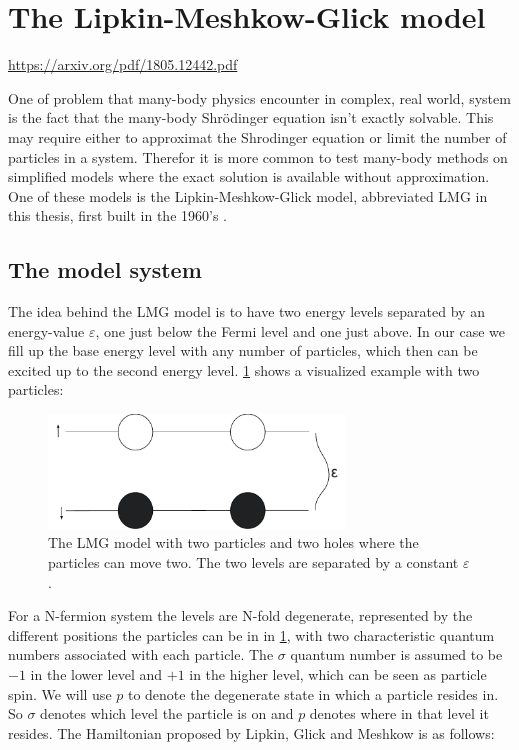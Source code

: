 \section{The Lipkin-Meshkow-Glick model}
\url{https://arxiv.org/pdf/1805.12442.pdf}

One of problem that many-body physics encounter in complex, real world, system is the fact that the many-body Shrödinger equation isn't exactly solvable. This may require either to approximat the Shrodinger equation or limit the number of particles in a system. Therefor it is more common to test many-body methods on simplified models where the exact solution is available without approximation. One of these models is the Lipkin-Meshkow-Glick model, abbreviated LMG in this thesis, first built in the 1960's \cite{LIPKIN1965188}.  
\subsection{The model system}

The idea behind the LMG model is to have two energy levels separated by an energy-value $\varepsilon$, one just below the Fermi level and one just above. In our case we fill up the base energy level with any number of particles, which then can be excited up to the second energy level. \ref{fig:lipkinnumbered} shows a visualized example with two particles:

\begin{figure}[H]
    \centering
    \includegraphics[width=0.7\textwidth]{Figures/Drawn/Lipkin/Lipkinstart22.pdf}
    \caption{The LMG model with two particles and two holes where the particles can move two. The two levels are separated by a constant $\varepsilon$. }
    \label{fig:lipkinnumbered}
\end{figure}

For a N-fermion system the levels are N-fold degenerate, represented by the different positions the particles can be in in \ref{fig:lipkinnumbered}, with two characteristic quantum numbers associated with each particle. The $\sigma$ quantum number is assumed to be $-1$ in the lower level and $+1$ in the higher level, which can be seen as particle spin. We will use $p$ to denote the degenerate state in which a particle resides in. So $\sigma$ denotes which level the particle is on and $p$ denotes where in that level it resides. The Hamiltonian proposed by Lipkin, Glick and Meshkow is as follows:

